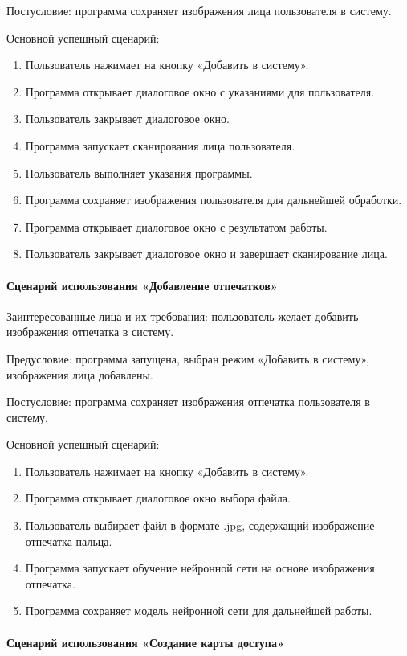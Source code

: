 Постусловие: программа сохраняет изображения лица пользователя  в систему.

Основной успешный сценарий:
\begin{enumerate}
	\item Пользователь нажимает на кнопку «Добавить в систему».
	\item Программа открывает диалоговое окно с указаниями для пользователя.
	\item Пользователь закрывает диалоговое окно.
	\item Программа запускает сканирования лица пользователя.
	\item Пользователь выполняет указания программы.
	\item Программа сохраняет изображения пользователя для дальнейшей обработки.
	\item Программа открывает диалоговое окно с результатом работы.
	\item Пользователь закрывает диалоговое окно и завершает сканирование лица.
\end{enumerate}

\paragraph{Сценарий использования «Добавление отпечатков»}

Заинтересованные лица и их требования: пользователь желает добавить изображения отпечатка в систему.

Предусловие: программа запущена, выбран режим «Добавить в систему», изображения лица добавлены.

Постусловие: программа сохраняет изображения отпечатка пользователя в систему.

Основной успешный сценарий:
\begin{enumerate}
	\item Пользователь нажимает на кнопку «Добавить в систему».
	\item Программа открывает диалоговое окно выбора файла.
	\item Пользователь выбирает файл в формате .jpg, содержащий изображение отпечатка пальца.
	\item Программа запускает обучение нейронной сети на основе изображения отпечатка.
	\item Программа сохраняет модель нейронной сети для дальнейшей работы.
\end{enumerate}

\paragraph{Сценарий использования «Создание карты доступа»}

